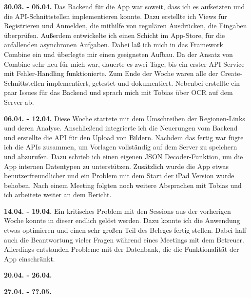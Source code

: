 \documentclass[nomenclature, oneside, 150]{HSMW-Thesis}
\begin{document}
	\textbf{30.03. - 05.04.} 
	Das Backend für die App war soweit, dass ich es aufsetzten und die API-Schnittstellen implementieren konnte. Dazu erstellte ich Views für Registrieren und Anmelden, die mithilfe von regulären Ausdrücken, die Eingaben überprüfen. Außerdem entwickelte ich einen Schicht im App-Store, für die anfallenden asynchronen Aufgaben. Dabei laß ich mich in das Framework Combine ein und überlegte mir einen geeigneten Aufbau. Da der Ansatz von Combine sehr neu für mich war, dauerte es zwei Tage, bis ein erster API-Service mit Fehler-Handling funktionierte. Zum Ende der Woche waren alle der Create-Schnittstellen implementiert, getestet und dokumentiert. Nebenbei erstellte ein paar Issues für das Backend und sprach mich mit Tobias über OCR auf dem Server ab.
	
	\textbf{06.04. - 12.04.}
	Diese Woche startete mit dem Umschreiben der Regionen-Links und deren Analyse. Anschließend integrierte ich die Neuerungen vom Backend und erstellte die API für den Upload von Bildern. Nachdem das fertig war fügte ich die APIs zusammen, um Vorlagen vollständig auf dem Server zu speichern und abzurufen. Dazu schrieb ich einen eigenen JSON Decoder-Funktion, um die App internen Datentypen zu unterstützen. Zusätzlich wurde die App etwas benutzerfreundlicher und ein Problem mit dem Start der iPad Version wurde behoben. Nach einem Meeting folgten noch weitere Absprachen mit Tobias und ich arbeitete weiter an dem Bericht.
	
	\textbf{14.04. - 19.04.}
	Ein kritisches Problem mit den Sessions aus der vorherigen Woche konnte in dieser endlich gelöst werden. Dazu konnte ich die Anwendung etwas optimieren und einen sehr großen Teil des Beleges fertig stellen. Dabei half auch die Beantwortung vieler Fragen während eines Meetings mit dem Betreuer. Allerdings entstanden Probleme mit der Datenbank, die die Funktionalität der App einschränkt.
	
	\textbf{20.04. - 26.04.}
	
	\textbf{27.04. - ??.05.}




\end{document}
